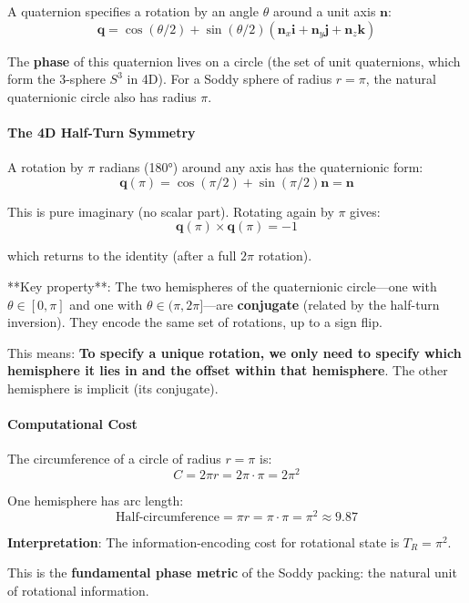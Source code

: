 \documentclass[11pt,a4paper]{article}
\begin{document}
  A quaternion specifies a rotation by an angle $\theta$ around a unit axis $\mathbf{n}$:
  \[
  \mathbf{q} = \cos(\theta/2) + \sin(\theta/2) (\mathbf{n}_x \mathbf{i} + \mathbf{n}_y \mathbf{j} + \mathbf{n}_z \mathbf{k})
  \]

  The \textbf{phase} of this quaternion lives on a circle (the set of unit quaternions, which form the 3-sphere $S^3$ in 4D). For a Soddy sphere of radius $r = \pi$, the natural quaternionic circle also has radius $\pi$.

  \paragraph{The 4D Half-Turn Symmetry}

  A rotation by $\pi$ radians (180°) around any axis has the quaternionic form:
  \[
  \mathbf{q}(\pi) = \cos(\pi/2) + \sin(\pi/2) \mathbf{n} = \mathbf{n}
  \]

  This is pure imaginary (no scalar part). Rotating again by $\pi$ gives:
  \[
  \mathbf{q}(\pi) \times \mathbf{q}(\pi) = -1
  \]

  which returns to the identity (after a full $2\pi$ rotation).

  **Key property**: The two hemispheres of the quaternionic circle—one with $\theta \in [0, \pi]$ and one with $\theta \in (\pi, 2\pi]$—are \textbf{conjugate} (related by the half-turn inversion). They encode the same set of rotations, up to a sign flip.

  This means: \textbf{To specify a unique rotation, we only need to specify which hemisphere it lies in and the offset within that hemisphere}. The other hemisphere is implicit (its conjugate).

  \paragraph{Computational Cost}

  The circumference of a circle of radius $r = \pi$ is:
  \[
  C = 2\pi r = 2\pi \cdot \pi = 2\pi^2
  \]

  One hemisphere has arc length:
  \[
  \text{Half-circumference} = \pi r = \pi \cdot \pi = \pi^2 \approx 9.87
  \]

  \noindent\textbf{Interpretation}: The information-encoding cost for rotational state is $T_R = \pi^2$.

  \noindent This is the \textbf{fundamental phase metric} of the Soddy packing: the natural unit of rotational information.
\end{document}
